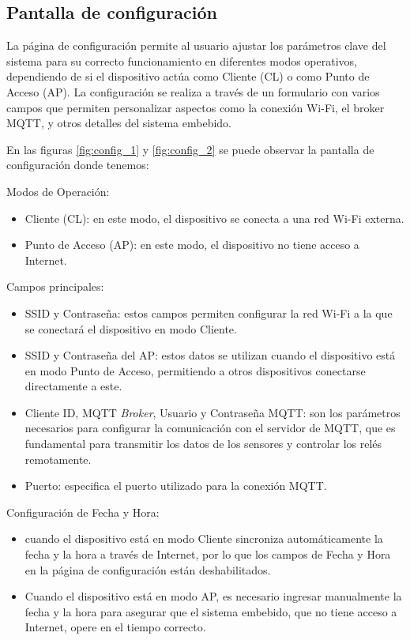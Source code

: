 \subsection{Pantalla de configuración}

La página de configuración permite al usuario ajustar los parámetros clave del sistema para su correcto funcionamiento en diferentes modos operativos, dependiendo de si el dispositivo actúa como Cliente (CL) o como Punto de Acceso (AP). La configuración se realiza a través de un formulario con varios campos que permiten personalizar aspectos como la conexión Wi-Fi, el broker MQTT, y otros detalles del sistema embebido.

En las figuras \ref{fig:config_1} y \ref{fig:config_2} se puede observar la pantalla de configuración donde tenemos:

Modos de Operación:

\begin{itemize}
	\item Cliente (CL): en este modo, el dispositivo se conecta a una red Wi-Fi externa.
	\item Punto de Acceso (AP): en este modo, el dispositivo no tiene acceso a Internet.
\end{itemize}

Campos principales:

\begin{itemize}
	\item SSID y Contraseña: estos campos permiten configurar la red Wi-Fi a la que se conectará el dispositivo en modo Cliente. 
	\item SSID y Contraseña del AP: estos datos se utilizan cuando el dispositivo está en modo Punto de Acceso, permitiendo a otros dispositivos conectarse directamente a este.
	\item Cliente ID, MQTT \textit{Broker}, Usuario y Contraseña MQTT: son los parámetros necesarios para configurar la comunicación con el servidor de MQTT, que es fundamental para transmitir los datos de los sensores y controlar los relés remotamente.
	\item Puerto: especifica el puerto utilizado para la conexión MQTT.
\end{itemize}

Configuración de Fecha y Hora:

\begin{itemize}
	\item cuando el dispositivo está en modo Cliente sincroniza automáticamente la fecha y la hora a través de Internet, por lo que los campos de Fecha y Hora en la página de configuración están deshabilitados.
	\item Cuando el dispositivo está en modo AP, es necesario ingresar manualmente la fecha y la hora para asegurar que el sistema embebido, que no tiene acceso a Internet, opere en el tiempo correcto.
\end{itemize}


